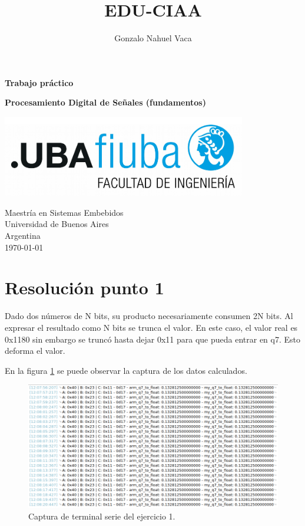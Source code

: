 \documentclass[
    11pt,
    spanish,
	a4paper
]{article}
\title{EDU-CIAA}
\author{Gonzalo Nahuel Vaca}
\def\doctype{Trabajo práctico}
\begin{document}
\makeatletter
\begin{titlepage}
	\begin{center}
		\vspace*{1cm}
		
		\Huge
		\textbf{\doctype}
		\vspace{0.5cm}
    
		\LARGE
		\@title
		\vspace{0.5cm}
    
		\textbf{Procesamiento Digital de Señales (fundamentos)}
		
		\vspace{1.5cm}
		
		\textbf{\@author}

		\vspace{1.5cm}

		\includegraphics[width=0.8\textwidth]{img/logoFIUBA.pdf}
		
		\vfill
		Maestría en Sistemas Embebidos\\
		Universidad de Buenos Aires\\
		Argentina\\
		\today
	\end{center}
\end{titlepage}
\makeatother
\newpage

\section{Resolución punto 1}

Dado dos números de N bits, su producto necesariamente consumen 2N bits.
Al expresar el resultado como N bits se trunca el valor.
En este caso, el valor real es 0x1180 sin embargo se truncó hasta dejar 0x11
para que pueda entrar en q7.
Esto deforma el valor.

En la figura \ref{fig:term1} se puede observar la captura de los datos calculados.

\begin{figure}[htbp]
	\centering
	\includegraphics[width=\textwidth]{img/cutecom01.png}
	\caption{Captura de terminal serie del ejercicio 1.}
	\label{fig:term1}
\end{figure}
\end{document}
